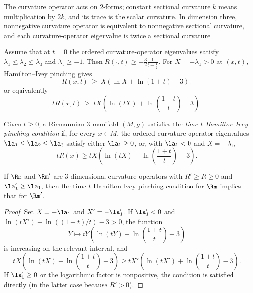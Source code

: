 The curvature operator acts on $2$-forms; constant sectional curvature $k$
means multiplication by $2k$, and its trace is the scalar curvature. In
dimension three, nonnegative curvature operator is equivalent to nonnegative
sectional curvature, and each curvature-operator eigenvalue is twice a
sectional curvature.

Assume that at $t=0$ the ordered curvature-operator eigenvalues satisfy
$\lambda_1\leq\lambda_2\leq\lambda_3$ and $\lambda_1\geq-1$. Then
$R(\cdot,t)\geq-\frac32\frac1{t+\frac12}$. For $X=-\lambda_1>0$ at $(x,t)$,
Hamilton--Ivey pinching gives \cite[Theorem 4.1]{Hamiltonn}
\begin{equation}
R(x,t)\: \ge \:X\left(\ln X+\ln(1+t)-3\right),
\end{equation}
or equivalently
\begin{equation} \label{estimate}
tR(x,t)\: \ge \:tX\left(\ln(tX)+\ln(\frac{1+t}{t})-3\right).
\end{equation}

\begin{definition}
  \label{def:kl-almost-nonnegative-curvature-positivity-curvature-operators}
 \label{HamIvey}

Given $t\geq0$, a Riemannian $3$-manifold $(M,g)$ satisfies the
\emph{time-$t$ Hamilton-Ivey pinching condition} if, for every $x\in M$,
the ordered curvature-operator eigenvalues
$\la_1\leq\la_2\leq\la_3$ satisfy either $\la_1\geq0$, or, with
$\la_1<0$ and $X=-\lambda_1$,
\[tR(x)\geq tX\left(\ln(tX)+\ln\left(\frac{1+t}{t}\right)-3\right).\]
\end{definition}

\begin{lemma}
  \label{lem:kl-almost-nonnegative-curvature-monotonicity-scalar-curvature}

\label{lempinchingmonotonic}
If $\Rm$ and $\Rm'$ are $3$-dimensional curvature operators with
$R'\geq R\geq0$ and $\la_1'\geq\la_1$, then the time-$t$ Hamilton-Ivey
pinching condition for $\Rm$ implies that for $\Rm'$.
\end{lemma}
\begin{proof}
\sketch
Set $X=-\la_1$ and $X'=-\la_1'$. If $\la_1'<0$ and
$\ln(tX')+\ln((1+t)/t)-3>0$, the function
\begin{equation}
Y\mapsto tY\left(\ln(tY)+\ln\left(\frac{1+t}{t}\right)-3\right)
\end{equation}
is increasing on the relevant interval, and
\begin{equation}
tX\left(\ln(tX)+\ln\left(\frac{1+t}{t}\right)-3\right)
\geq tX'\left(\ln(tX')+\ln\left(\frac{1+t}{t}\right)-3\right).
\end{equation}
If $\la_1'\geq0$ or the logarithmic factor is nonpositive, the condition is
satisfied directly (in the latter case because $R'>0$).
\end{proof}

